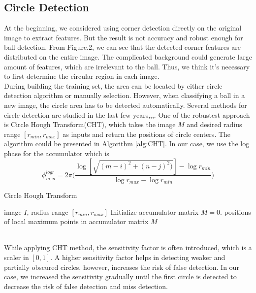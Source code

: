 \documentclass{article}
\begin{document}
\subsection{Circle Detection}
At the beginning, we considered using corner detection directly on the original image to extract features. But the result is not accuracy and robust enough for ball detection. From Figure.2, we can see that the detected corner features are distributed on the entire image. The complicated background could generate large amount of features, which are irrelevant to the ball. Thus, we think it's necessary to first determine the circular region in each image.\\
During building the training set, the area can be located by either circle detection algorithm or manually selection. However, when classifying a ball in a new image, the circle area has to be detected automatically. Several methods for circle detection are studied in the last few years,\cite{cirDetect1},\cite{cirDetect2},\cite{cirDetect3}. One of the robustest approach is Circle Hough Transform(CHT), which takes the image $M$ and desired radius range $[r_{min},r_{max}]$ as inputs and return the positions of circle centers. The algorithm could be presented in Algorithm \ref{alg:CHT}. In our case, we use the log phase for the accumulator which is
\begin{equation}
\phi_{m,n}^{logr} = 2\pi\Big(\frac{\log{[\sqrt{(m-i)^2+(n-j)^2)}]}-\log{r_{min}}}{\log{r_{max}}-\log{r_{min}}}\Big)
\end{equation}
\begin{algorithm}[tb]
   \caption{Circle Hough Transform}
   \label{alg:CHT}
\begin{algorithmic}
    image $I$, radius range $[r_{min},r_{max}]$
   \STATE Initialize accumulator matrix $M = 0$.
   \ENDIF
   \ENDFOR
   \ENDFOR
    positions of local maximum points in accumulator matrix $M$
\end{algorithmic}
\end{algorithm}\\
While applying CHT method, the sensitivity factor is often introduced, which is a scaler in $[0,1]$. A higher sensitivity factor helps in detecting weaker and partially obscured circles, however, increases the risk of false detection. In our case, we increased the sensitivity gradually until the first circle is detected to decrease the risk of false detection and miss detection.\\
\end{document}
